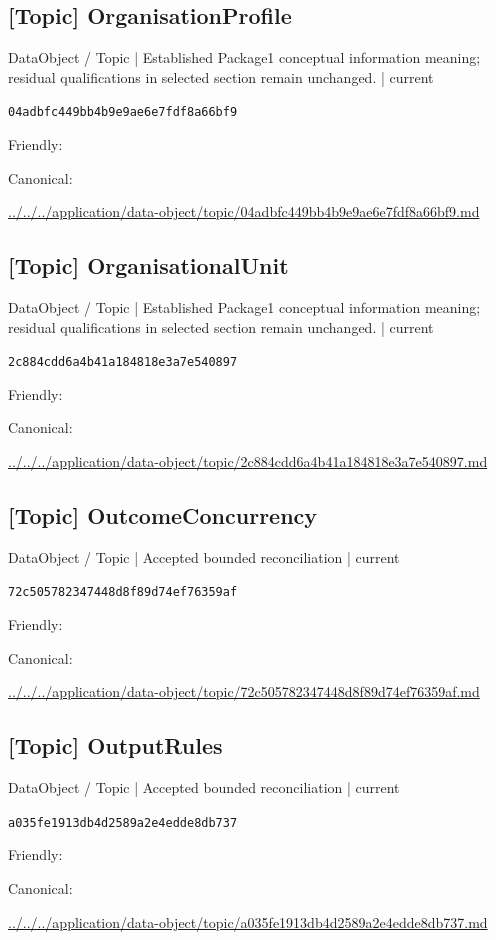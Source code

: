 \documentclass[10pt,a4paper]{article}
\begin{document}
\subsection*{[Topic] OrganisationProfile}
{\small DataObject / Topic | Established Package1 conceptual information meaning; residual qualifications in selected section remain unchanged. | current}\par
\texttt{04adbfc449bb4b9e9ae6e7fdf8a66bf9}\par
Friendly: \par
Canonical: \par
{\footnotesize\url{../../../application/data-object/topic/04adbfc449bb4b9e9ae6e7fdf8a66bf9.md}}\par
\subsection*{[Topic] OrganisationalUnit}
{\small DataObject / Topic | Established Package1 conceptual information meaning; residual qualifications in selected section remain unchanged. | current}\par
\texttt{2c884cdd6a4b41a184818e3a7e540897}\par
Friendly: \par
Canonical: \par
{\footnotesize\url{../../../application/data-object/topic/2c884cdd6a4b41a184818e3a7e540897.md}}\par
\subsection*{[Topic] OutcomeConcurrency}
{\small DataObject / Topic | Accepted bounded reconciliation | current}\par
\texttt{72c505782347448d8f89d74ef76359af}\par
Friendly: \par
Canonical: \par
{\footnotesize\url{../../../application/data-object/topic/72c505782347448d8f89d74ef76359af.md}}\par
\subsection*{[Topic] OutputRules}
{\small DataObject / Topic | Accepted bounded reconciliation | current}\par
\texttt{a035fe1913db4d2589a2e4edde8db737}\par
Friendly: \par
Canonical: \par
{\footnotesize\url{../../../application/data-object/topic/a035fe1913db4d2589a2e4edde8db737.md}}\par
\end{document}
